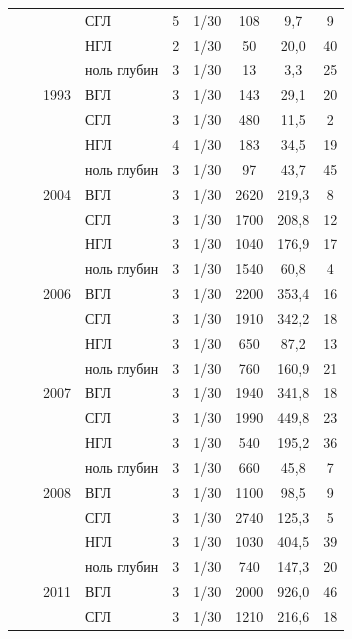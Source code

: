 \documentclass[12pt, a4paper]{disser}
\begin{document}
\begin{footnotesize}
\begin{longtable}{|p{2cm}|p{3cm}|p{1cm}|p{2cm}|p{1.5cm}|p{1cm}|*{3}{c|}}
		 &  &  & СГЛ & 5 & 1/30 & 108 & 9,7 & 9
		\\ \cline{4-9}
		 &  &  & НГЛ & 2 & 1/30 & 50 & 20,0 & 40
		\\ \cline{4-9}
		 &  &  & ноль глубин & 3 & 1/30 & 13 & 3,3 & 25
		\\ \cline{3-9}
		 &  & 1993 & ВГЛ & 3 & 1/30 & 143 & 29,1 & 20
		\\ \cline{4-9}
		 &  &  & СГЛ & 3 & 1/30 & 480 & 11,5 & 2
		\\ \cline{4-9}
		 &  &  & НГЛ & 4 & 1/30 & 183 & 34,5 & 19
		\\ \cline{4-9}
		 &  &  & ноль глубин & 3 & 1/30 & 97 & 43,7 & 45
		\\ \cline{3-9}
		 &  & 2004 & ВГЛ & 3 & 1/30 & 2620 & 219,3 & 8
		\\ \cline{4-9}
		 &  &  & СГЛ & 3 & 1/30 & 1700 & 208,8 & 12
		\\ \cline{4-9}
		 &  &  & НГЛ & 3 & 1/30 & 1040 & 176,9 & 17
		\\ \cline{4-9}
		 &  &  & ноль глубин & 3 & 1/30 & 1540 & 60,8 & 4
		\\ \cline{3-9}
		 &  & 2006 & ВГЛ & 3 & 1/30 & 2200 & 353,4 & 16
		\\ \cline{4-9}
		 &  &  & СГЛ & 3 & 1/30 & 1910 & 342,2 & 18
		\\ \cline{4-9}
		 &  &  & НГЛ & 3 & 1/30 & 650 & 87,2 & 13
		\\ \cline{4-9}
		 &  &  & ноль глубин & 3 & 1/30 & 760 & 160,9 & 21
		\\ \cline{3-9}
		 &  & 2007 & ВГЛ & 3 & 1/30 & 1940 & 341,8 & 18
		\\ \cline{4-9}
		 &  &  & СГЛ & 3 & 1/30 & 1990 & 449,8 & 23
		\\ \cline{4-9}
		 &  &  & НГЛ & 3 & 1/30 & 540 & 195,2 & 36
		\\ \cline{4-9}
		 &  &  & ноль глубин & 3 & 1/30 & 660 & 45,8 & 7
		\\ \cline{3-9}
		 &  & 2008 & ВГЛ & 3 & 1/30 & 1100 & 98,5 & 9
		\\ \cline{4-9}
		 &  &  & СГЛ & 3 & 1/30 & 2740 & 125,3 & 5
		\\ \cline{4-9}
		 &  &  & НГЛ & 3 & 1/30 & 1030 & 404,5 & 39
		\\ \cline{4-9}
		 &  &  & ноль глубин & 3 & 1/30 & 740 & 147,3 & 20
		\\ \cline{3-9}
		 &  & 2011 & ВГЛ & 3 & 1/30 & 2000 & 926,0 & 46
		\\ \cline{4-9}
		 &  &  & СГЛ & 3 & 1/30 & 1210 & 216,6 & 18
		\\ \cline{4-9}

\end{longtable}
\end{footnotesize}
\end{document}
